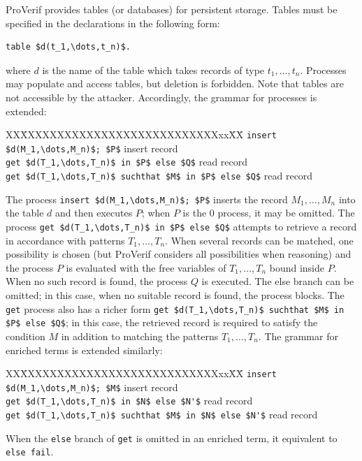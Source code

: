 \documentclass{book}
\newcommand{\nill}{0}
\begin{document}
ProVerif provides tables (or databases) for persistent storage. Tables must be specified in the declarations in the following form:
%
\begin{lstlisting}[numbers=none]
	table $d(t_1,\dots,t_n)$.
\end{lstlisting}
%
where $d$ is the name of the table which takes records of type $t_1,\ldots,t_n$. Processes may populate and access tables, but deletion is forbidden. Note that tables are not accessible by the attacker. Accordingly, the grammar for processes is extended:
%
\begin{tabbing}
   XX\=XXXXXXXXXXXXXXXXXXXXXXXXXXXxx\=XX\=\kill     %
\>\lstinline!insert $d(M_1,\dots,M_n)$; $P$!	\> insert record	\\
\>\lstinline!get $d(T_1,\dots,T_n)$ in $P$ else $Q$!		\> read record\\
\>\lstinline!get $d(T_1,\dots,T_n)$ suchthat $M$ in $P$ else $Q$!\> read record
\end{tabbing}
%
The process \lstinline!insert $d(M_1,\dots,M_n)$; $P$! inserts the record $M_1,\ldots,M_n$ into the table $d$ and then executes $P$; when $P$ is the $\nill$ process, it may be omitted. The process \lstinline!get $d(T_1,\dots,T_n)$ in $P$ else $Q$! attempts to retrieve a record in accordance with patterns $T_1,\dots,T_n$. When several records can be matched, one possibility is chosen (but ProVerif considers all possibilities when reasoning) and the process $P$ is evaluated with the free variables of $T_1,\dots,T_n$ bound inside $P$. When no such record is found, the process $Q$ is executed. The else branch can be omitted; in this case, when no suitable record is found, the process blocks. The \lstinline!get! process also has a richer form \lstinline!get $d(T_1,\dots,T_n)$ suchthat $M$ in $P$ else $Q$!; in this case, the retrieved record is required to satisfy the condition $M$ in addition to matching the patterns $T_1, \ldots, T_n$.
The grammar for enriched terms is extended similarly:
\begin{tabbing}
   XX\=XXXXXXXXXXXXXXXXXXXXXXXXXXXxx\=XX\=\kill     %
\>\lstinline!insert $d(M_1,\dots,M_n)$; $M$!	\> insert record	\\
\>\lstinline!get $d(T_1,\dots,T_n)$ in $N$ else $N'$!	\> read record\\
\>\lstinline!get $d(T_1,\dots,T_n)$ suchthat $M$ in $N$ else $N'$!	\> read record
\end{tabbing}
When the \lstinline!else! branch of \lstinline!get! is omitted in an enriched term, it equivalent to \lstinline!else fail!.
\end{document}
